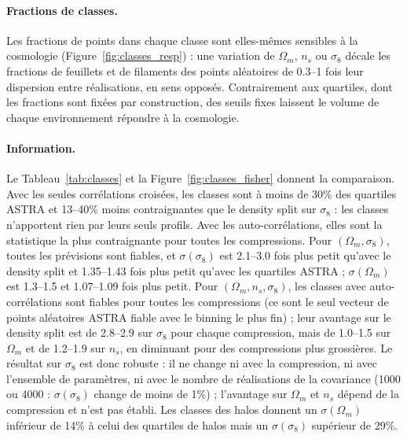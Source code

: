 \paragraph{Fractions de classes.} Les fractions de points dans chaque classe sont elles-mêmes sensibles à la cosmologie (Figure~\ref{fig:classes_resp}) : une variation de $\Omega_m$, $n_s$ ou $\sigma_8$ décale les fractions de feuillets et de filaments des points aléatoires de 0.3--1 fois leur dispersion entre réalisations, en sens opposés. Contrairement aux quartiles, dont les fractions sont fixées par construction, des seuils fixes laissent le volume de chaque environnement répondre à la cosmologie.

\paragraph{Information.} Le Tableau~\ref{tab:classes} et la Figure~\ref{fig:classes_fisher} donnent la comparaison. Avec les seules corrélations croisées, les classes sont à moins de 30\% des quartiles ASTRA et 13--40\% moins contraignantes que le density split sur $\sigma_8$ : les classes n'apportent rien par leurs seuls profils. Avec les auto-corrélations, elles sont la statistique la plus contraignante pour toutes les compressions. Pour $(\Omega_m,\sigma_8)$, toutes les prévisions sont fiables, et $\sigma(\sigma_8)$ est 2.1--3.0 fois plus petit qu'avec le density split et 1.35--1.43 fois plus petit qu'avec les quartiles ASTRA ; $\sigma(\Omega_m)$ est 1.3--1.5 et 1.07--1.09 fois plus petit. Pour $(\Omega_m,n_s,\sigma_8)$, les classes avec auto-corrélations sont fiables pour toutes les compressions (ce sont le seul vecteur de points aléatoires ASTRA fiable avec le binning le plus fin) ; leur avantage sur le density split est de 2.8--2.9 sur $\sigma_8$ pour chaque compression, mais de 1.0--1.5 sur $\Omega_m$ et de 1.2--1.9 sur $n_s$, en diminuant pour des compressions plus grossières. Le résultat sur $\sigma_8$ est donc robuste : il ne change ni avec la compression, ni avec l'ensemble de paramètres, ni avec le nombre de réalisations de la covariance (1000 ou 4000 : $\sigma(\sigma_8)$ change de moins de 1\%) ; l'avantage sur $\Omega_m$ et $n_s$ dépend de la compression et n'est pas établi. Les classes des halos donnent un $\sigma(\Omega_m)$ inférieur de 14\% à celui des quartiles de halos mais un $\sigma(\sigma_8)$ supérieur de 29\%.


